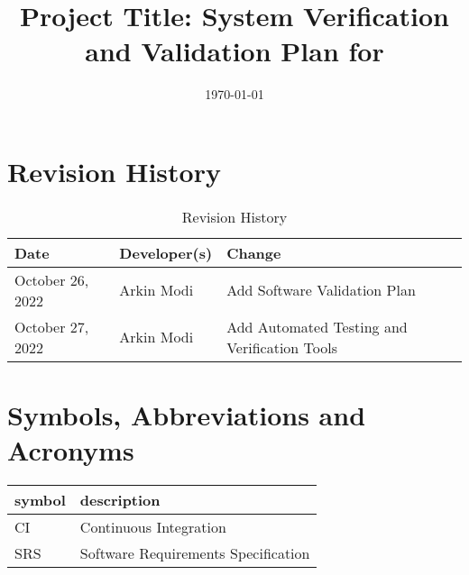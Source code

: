 \documentclass[12pt, titlepage]{article}
\begin{document}
\title{Project Title: System Verification and Validation Plan for \progname{}}
\author{\authname}
\date{\today}

\maketitle


\section{Revision History}

\begin{table}[hp]
	\caption{Revision History} \label{TblRevisionHistory}
	\begin{tabularx}{\textwidth}{llX}
		\toprule
		\textbf{Date}    & \textbf{Developer(s)} & \textbf{Change}                              \\
		\midrule
		October 26, 2022 & Arkin Modi            & Add Software Validation Plan                 \\
		October 27, 2022 & Arkin Modi            & Add Automated Testing and Verification Tools \\
		\bottomrule
	\end{tabularx}
\end{table}

\newpage

\tableofcontents

\listoftables
{}

\listoffigures
{}

\newpage

\section{Symbols, Abbreviations and Acronyms}

\renewcommand{\arraystretch}{1.2}
\begin{tabular}{l l}
	\toprule
	\textbf{symbol} & \textbf{description}                \\
	\midrule
	CI              & Continuous Integration              \\
	SRS             & Software Requirements Specification \\
	\bottomrule
\end{tabular}\\

\end{document}
